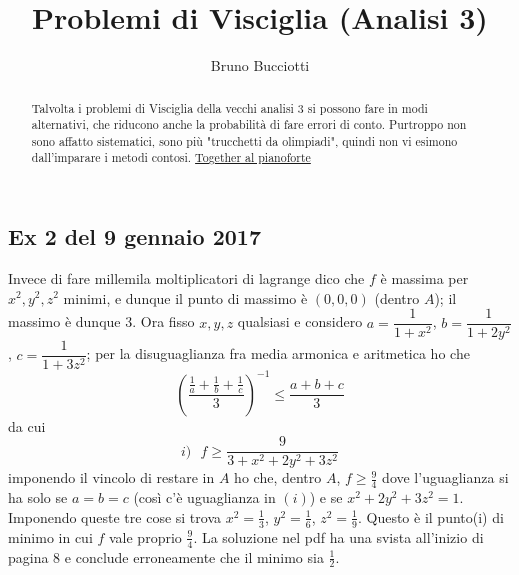 \documentclass[]{article}
\title{Problemi di Visciglia (Analisi 3)}
\author{Bruno Bucciotti}
\begin{document}
\maketitle

\begin{abstract}
Talvolta i problemi di Visciglia della vecchi analisi 3 si possono fare in modi alternativi, che riducono anche la probabilità di fare errori di conto. Purtroppo non sono affatto sistematici, sono più "trucchetti da olimpiadi", quindi non vi esimono dall'imparare i metodi contosi. \href{https://www.youtube.com/watch?v=Fh-saZE73jM}{Together al pianoforte}
\end{abstract}

\subsection*{Ex 2 del 9 gennaio 2017}
Invece di fare millemila moltiplicatori di lagrange dico che $f$ è massima per $x^2,y^2,z^2$ minimi, e dunque il punto di massimo è $(0,0,0)$ (dentro $A$); il massimo è dunque 3.
Ora fisso $x,y,z$ qualsiasi e considero $a = \dfrac{1}{1+x^2}$, $b = \dfrac{1}{1+2y^2}$, $c = \dfrac{1}{1+3z^2}$; per la disuguaglianza fra media armonica e aritmetica ho che
$$\left(\dfrac{\frac{1}{a}+\frac{1}{b}+\frac{1}{c}}{3}\right)^{-1} \leq \dfrac{a+b+c}{3}$$
da cui
$$i)\,\,\,\, f \geq \dfrac{9}{3 + x^2 + 2y^2 + 3z^2}$$
imponendo il vincolo di restare in $A$ ho che, dentro $A$, $f\geq \frac{9}{4}$ dove l'uguaglianza si ha solo se $a=b=c$ (così c'è uguaglianza in $(i)$) e se $x^2 + 2y^2 + 3z^2=1$. Imponendo queste tre cose si trova $x^2=\frac{1}{3}$, $y^2=\frac{1}{6}$, $z^2=\frac{1}{9}$. Questo è il punto(i) di minimo in cui $f$ vale proprio $\frac{9}{4}$. La soluzione nel pdf ha una svista all'inizio di pagina 8 e conclude erroneamente che il minimo sia $\frac{1}{2}$.
\end{document}
